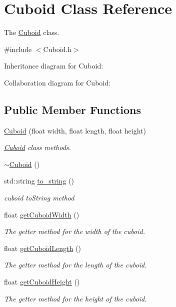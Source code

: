 \hypertarget{classCuboid}{}\section{Cuboid Class Reference}
\label{classCuboid}


The \hyperlink{classCuboid}{Cuboid} class.  




{\ttfamily \#include $<$Cuboid.\+h$>$}



Inheritance diagram for Cuboid\+:


Collaboration diagram for Cuboid\+:
\subsection*{Public Member Functions}
\begin{DoxyCompactItemize}
\item 
\hyperlink{classCuboid_acac2c8d1fb8f6702d1461f3fd4db1407}{Cuboid} (float width, float length, float height)
\begin{DoxyCompactList}\small\item\em \hyperlink{classCuboid}{Cuboid} class methods. \end{DoxyCompactList}\item 
\hyperlink{classCuboid_aba010c63b64540741c25b5e89b7fabbb}{$\sim$\+Cuboid} ()
\item 
std\+::string \hyperlink{classCuboid_adc91ccac4a02d1afe77271e1590b27e8}{to\+\_\+string} ()
\begin{DoxyCompactList}\small\item\em cuboid to\+String method \end{DoxyCompactList}\item 
float \hyperlink{classCuboid_adf7b30445189bc0ef14a608ceb8ea710}{get\+Cuboid\+Width} ()
\begin{DoxyCompactList}\small\item\em The getter method for the width of the cuboid. \end{DoxyCompactList}\item 
float \hyperlink{classCuboid_a49831ed499078fe5dfea7d6b6129542e}{get\+Cuboid\+Length} ()
\begin{DoxyCompactList}\small\item\em The getter method for the length of the cuboid. \end{DoxyCompactList}\item 
float \hyperlink{classCuboid_afff4e73d9eca880115b82962db9a0a81}{get\+Cuboid\+Height} ()
\begin{DoxyCompactList}\small\item\em The getter method for the height of the cuboid. \end{DoxyCompactList}\end{DoxyCompactItemize}
